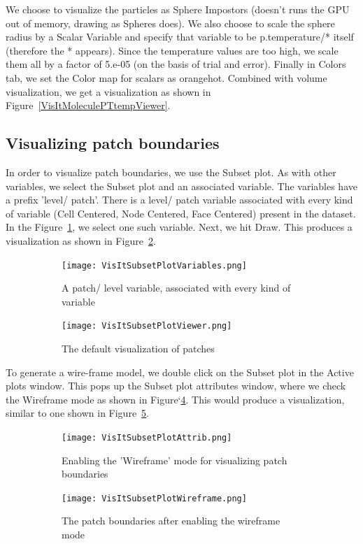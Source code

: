We choose to visualize the particles as Sphere Impostors (doesn't runs
the GPU out of memory, drawing as Spheres does). We also choose to
scale the sphere radius by a Scalar Variable and specify that variable
to be p.temperature/* itself (therefore the * appears). Since the
temperature values are too high, we scale them all by a factor of
5.e-05 (on the basis of trial and error). Finally in Colors tab, we
set the Color map for scalars as orangehot.  Combined with volume
visualization, we get a visualization as shown in
Figure~\ref{VisItMoleculePTtempViewer}.


\subsection{Visualizing patch boundaries}
In order to visualize patch boundaries, we use the Subset plot. As
with other variables, we select the Subset plot and an associated
variable. The variables have a prefix 'level/ patch'. There is a
level/ patch variable associated with every kind of variable (Cell
Centered, Node Centered, Face Centered) present in the dataset. In the
Figure~\ref{VisItSubsetPlotVariables}, we select one such variable.
Next, we hit Draw. This produces a visualization as shown in
Figure~\ref{VisItSubsetPlotViewer}.
\begin{figure}[htb]
  \centering
  \begin{subfigure}[b]{0.4\textwidth}
    \texttt{[image: VisItSubsetPlotVariables.png]}
    \caption{A patch/ level variable, associated with every kind of variable}
    \label{VisItSubsetPlotVariables}
  \end{subfigure}
  \hspace{50pt}
  \begin{subfigure}[b]{0.4\textwidth}
    \texttt{[image: VisItSubsetPlotViewer.png]}
    \caption{The default visualization of patches}
    \label{VisItSubsetPlotViewer}
  \end{subfigure}
  \caption{}
  \label{ucf.fig7}
\end{figure}

To generate a wire-frame model, we double click on the Subset plot in
the Active plots window. This pops up the Subset plot attributes
window, where we check the Wireframe mode as shown in
Figure`\ref{VisItSubsetPlotAttrib}. This would produce a
visualization, similar to one shown in
Figure~\ref{VisItSubsetPlotWireframe}.
\begin{figure}[htb]
  \centering
  \begin{subfigure}[b]{0.4\textwidth}
    \centering
    \texttt{[image: VisItSubsetPlotAttrib.png]}
    \caption{Enabling the 'Wireframe' mode for visualizing patch boundaries}
    \label{VisItSubsetPlotAttrib}
  \end{subfigure}
  \hspace{50pt}
  \begin{subfigure}[b]{0.4\textwidth}
    \centering
    \texttt{[image: VisItSubsetPlotWireframe.png]}
    \caption{The patch boundaries after enabling the wireframe mode}
    \label{VisItSubsetPlotWireframe}
  \end{subfigure}
  \caption{}
  \label{ucf.fig8}
\end{figure}


